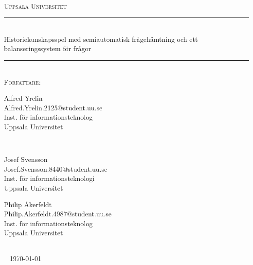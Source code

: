 \documentclass[a4paper, 11pt]{article}
\begin{document}
\begin{titlepage}
\newcommand{\HRule}{\rule{\linewidth}{0.5mm}}
\begin{center}

\textsc{\Large }\\[2.5cm]
\textsc{\LARGE Uppsala Universitet}\\[1.5cm] 

\HRule \\[0.3cm]
{ \huge \textup {Historiekunskapsspel med semiautomatisk frågehämtning och ett balanseringssystem för frågor}}\\[0.3cm]
\HRule \\[1.5cm]


\Large \textsc{Författare:}\\[0.5cm]
\end{center}
\begin{minipage}{0.4\textwidth}
\begin{flushleft} \large
\large \textup{Alfred Yrelin}\\
\large \textup{Alfred.Yrelin.2125@student.uu.se}\\
\large \textup{\textup{Inst. för informationsteknolog}}\\
\large \textup{\textup{Uppsala Universitet}}
\end{flushleft}
\end{minipage}
~ \hfill
\begin{minipage}{0.4\textwidth}
\begin{flushright} \large
\large \textup{Josef Svensson}\\
\large \textup{Josef.Svensson.8440@student.uu.se}\\
\large \textup{\textup{Inst. för informationsteknologi}}\\
\large \textup{\textup{Uppsala Universitet}}
\end{flushright}
\end{minipage}

\center

\begin{minipage}{0.4\textwidth}
\large \textup{Philip Åkerfeldt}\\
\large \textup{Philip.Akerfeldt.4987@student.uu.se}\\
\large \textup{\textup{Inst. för informationsteknolog}}\\
\large \textup{\textup{Uppsala Universitet}}
\end{minipage}\\ [1.5cm]
~
{\Large \today}\\[2cm]
\vfill

\end{titlepage}
\end{document}
